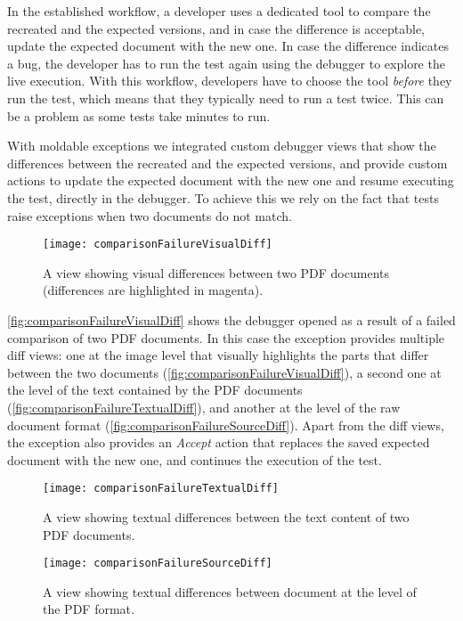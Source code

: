 \documentclass[sigplan,10pt]{acmart}
\begin{document}
In the established workflow, a developer uses a dedicated tool to compare the recreated and the expected versions, and in case the difference is acceptable, update the expected document with the new one.
In case the difference indicates a bug, the developer has to run the test again using the debugger to explore the live execution.
With this workflow, developers have to choose the tool \emph{before} they run the test, which means that they typically need to run a test twice.
This can be a problem as some tests take minutes to run.

With moldable exceptions we integrated custom debugger views that show the differences between the recreated and the expected versions, and provide custom actions to update the expected document with the new one and resume executing the test, directly in the debugger.
To achieve this we rely on the fact that tests raise  exceptions when two documents do not match.

\begin{figure*}[h]
  \texttt{[image: comparisonFailureVisualDiff]}
  \caption{A view showing visual differences between two PDF documents (differences are highlighted in magenta).}
  \label{fig:comparisonFailureVisualDiff}
\end{figure*}


\autoref{fig:comparisonFailureVisualDiff} shows the debugger opened as a result of a failed comparison of two PDF documents.
In this case the exception provides multiple diff views:
one at the image level that visually highlights the parts that differ between the two documents (\autoref{fig:comparisonFailureVisualDiff}),
a second one at the level of the text contained by the PDF documents (\autoref{fig:comparisonFailureTextualDiff}),
and another at the level of the raw document format (\autoref{fig:comparisonFailureSourceDiff}).
Apart from the diff views, the exception also provides an \emph{Accept} action that replaces the saved expected document with the new one, and continues the execution of the test.

\begin{figure}[h]
  \texttt{[image: comparisonFailureTextualDiff]}
  \caption{A view showing textual differences between the text content of two PDF documents.}
  \label{fig:comparisonFailureTextualDiff}
\end{figure}

\begin{figure}[h]
  \texttt{[image: comparisonFailureSourceDiff]}
  \caption{A view showing textual differences between document at the level of the PDF format.}
  \label{fig:comparisonFailureSourceDiff}
\end{figure}
\end{document}
